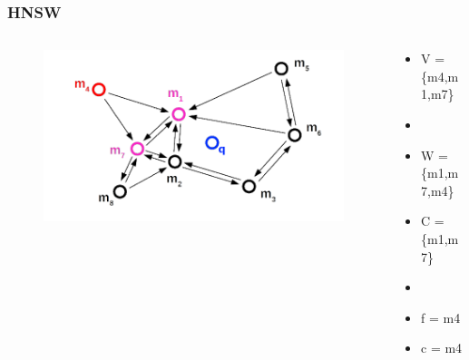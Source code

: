 \documentclass{beamer}
\begin{document}
	\begin{frame}
		\frametitle{HNSW}
		\begin{columns}[T] %
			\begin{column}{.6\textwidth}
				\begin{figure}
					\includegraphics[scale=0.3]{figures/HNSW_b4.png}
				\end{figure}
			\end{column}%
			\hfill%
			\begin{column}{.4\textwidth}
				\begin{itemize}
					\item V = \{m4,m1,m7\}
					\item[]
					\item W = \{m1,m7,m4\}
					\item C = \{m1,m7\}
					\item[]
					\item f = m4
					\item c = m4
				\end{itemize}
			\end{column}%
		\end{columns}
	\end{frame}
\end{document}
